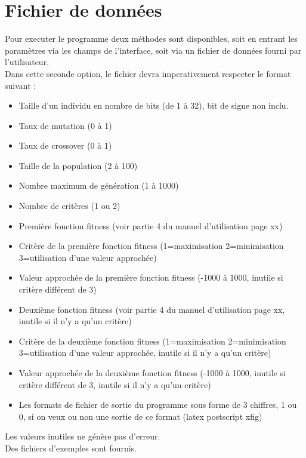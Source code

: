 \documentclass[a4paper,11pt]{article}
\begin{document}
\section{Fichier de données}
Pour executer le programme deux méthodes sont disponibles, soit en entrant les paramètres via les champs de l'interface, soit via un fichier de données fourni par l'utilisateur.\\
Dans cette seconde option, le fichier devra imperativement respecter le format suivant : \\
\begin{itemize}
 \item Taille d'un individu en nombre de bits (de 1 à 32), bit de signe non inclu.
 \item Taux de mutation (0 à 1)
 \item Taux de crossover (0 à 1)
 \item Taille de la population (2 à 100)
 \item Nombre maximum de génération (1 à 1000)
 \item Nombre de critères (1 ou 2)
 \item Première fonction fitness (voir partie 4 du manuel d'utilisation page xx)
 \item Critère de la première fonction fitness (1=maximisation 2=minimisation 3=utilisation d'une valeur approchée)
 \item Valeur approchée de la première fonction fitness (-1000 à 1000, inutile si critère différent de 3)
 \item Deuxième fonction fitness (voir partie 4 du manuel d'utilisation page xx, inutile si il n'y a qu'un critère)
 \item Critère de la deuxième fonction fitness (1=maximisation 2=minimisation 3=utilisation d'une valeur approchée, inutile si il n'y a qu'un critère)
 \item Valeur approchée de la deuxième fonction fitness (-1000 à 1000, inutile si critère différent de 3, inutile si il n'y a qu'un critère)
 \item Les formats de fichier de sortie du programme sous forme de 3 chiffres, 1 ou 0, si on veux ou non une sortie de ce format (latex postscript xfig)
 \end{itemize}
 Les valeurs inutiles ne génère pas d'erreur.\\
 Des fichiers d'exemples sont fournis.\\

\newpage
\end{document}
